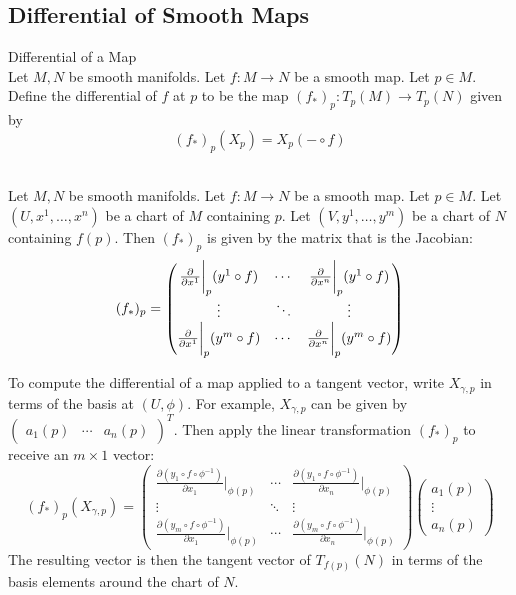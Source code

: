 \documentclass[a4paper]{article}
\begin{document}
\subsection{Differential of Smooth Maps}
\begin{defn}{Differential of a Map}{}\\
Let $M,N$ be smooth manifolds. Let $f:M\to N$ be a smooth map. Let $p\in M$. Define the differential of $f$ at $p$ to be the map $(f_\ast)_p:T_p(M)\to T_p(N)$ given by $$(f_\ast)_p(X_p)=X_p(-\circ f)$$
\end{defn}

\begin{thm}{}{}\\
Let $M,N$ be smooth manifolds. Let $f:M\to N$ be a smooth map. Let $p\in M$. Let $(U,x^1,\dots,x^n)$ be a chart of $M$ containing $p$. Let $(V,y^1,\dots,y^m)$ be a chart of $N$ containing $f(p)$. Then $(f_\ast)_p$ is given by the matrix that is the Jacobian: $$(f_\ast)_p=\begin{pmatrix}
\frac{\partial }{\partial x^1}\bigg{|}_p(y^1\circ f) & \cdots & \frac{\partial }{\partial x^n}\bigg{|}_p(y^1\circ f)\\
\vdots & \ddots & \vdots\\
\frac{\partial }{\partial x^1}\bigg{|}_p(y^m\circ f) & \cdots & \frac{\partial }{\partial x^n}\bigg{|}_p(y^m\circ f)
\end{pmatrix}$$
\end{thm}

To compute the differential of a map applied to a tangent vector, write $X_{\gamma,p}$ in terms of the basis at $(U,\phi)$. For example, $X_{\gamma,p}$ can be given by $\begin{pmatrix}
a_1(p) & \cdots & a_n(p)
\end{pmatrix}^T$. Then apply the linear transformation $(f_\ast)_p$ to receive an $m\times 1$ vector: $$(f_\ast)_p(X_{\gamma,p})=\begin{pmatrix}
\frac{\partial(y_1\circ f\circ\phi^{-1})}{\partial x_1}|_{\phi(p)} & \cdots & \frac{\partial (y_1\circ f\circ\phi^{-1})}{\partial x_n}|_{\phi(p)}\\
\vdots & \ddots & \vdots\\
\frac{\partial(y_m\circ f\circ\phi^{-1})}{\partial x_1}|_{\phi(p)} & \cdots & \frac{\partial (y_m\circ f\circ\phi^{-1})}{\partial x_n}|_{\phi(p)}
\end{pmatrix}\begin{pmatrix}
a_1(p)\\
\vdots\\
a_n(p)
\end{pmatrix}$$ The resulting vector is then the tangent vector of $T_{f(p)}(N)$ in terms of the basis elements around the chart of $N$. 
\end{document}
